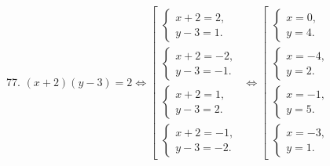 77. $(x+2)(y-3)=2\Leftrightarrow \left[\begin{array}{l}\begin{cases}x+2=2,\\ y-3=1.\end{cases}\\ \begin{cases}x+2=-2,\\ y-3=-1.\end{cases}\\
\begin{cases}x+2=1,\\ y-3=2.\end{cases}\\ \begin{cases}x+2=-1,\\ y-3=-2.\end{cases}\end{array}\right.\Leftrightarrow
\left[\begin{array}{l}\begin{cases}x=0,\\ y=4.\end{cases}\\ \begin{cases} x=-4,\\ y=2.\end{cases}\\
\begin{cases}x=-1,\\ y=5.\end{cases}\\ \begin{cases}x=-3,\\ y=1.\end{cases}\end{array}\right.$\\
